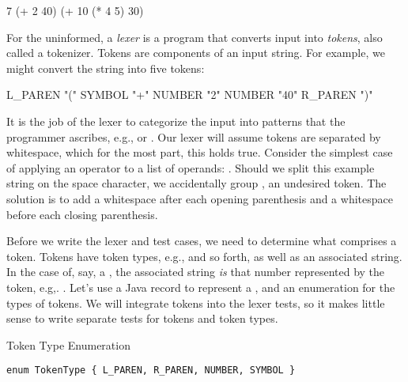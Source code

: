 \begin{verbnobox}[\small]
7
(+ 2 40)
(+ 10 (* 4 5) 30)
\end{verbnobox}

For the uninformed, a \textit{lexer} is a program that converts input into \textit{tokens}, also called a tokenizer. Tokens are components of an input string. For example, we might convert the string  into five tokens: 
\begin{verbnobox}[\small]
L_PAREN "("
SYMBOL "+"
NUMBER "2"
NUMBER "40"
R_PAREN ")"
\end{verbnobox}
It is the job of the lexer to categorize the input into patterns that the programmer ascribes, e.g.,  or . Our lexer will assume tokens are separated by whitespace, which for the most part, this holds true. Consider the simplest case of applying an operator to a list of operands: . Should we split this example string on the space character, we accidentally group , an undesired token. The solution is to add a whitespace after each opening parenthesis and a whitespace before each closing parenthesis. 

Before we write the lexer and test cases, we need to determine what comprises a token. Tokens have token types, e.g.,  and so forth, as well as an associated string. In the case of, say, a , the associated string \textit{is} that number represented by the token, e.g,. . Let's use a Java record to represent a , and an enumeration for the types of tokens. We will integrate tokens into the lexer tests, so it makes little sense to write separate tests for tokens and token types.

\begin{cl}{Token Type Enumeration}
\begin{lstlisting}[language=MyJava]
enum TokenType { L_PAREN, R_PAREN, NUMBER, SYMBOL }
\end{lstlisting}
\end{cl}


